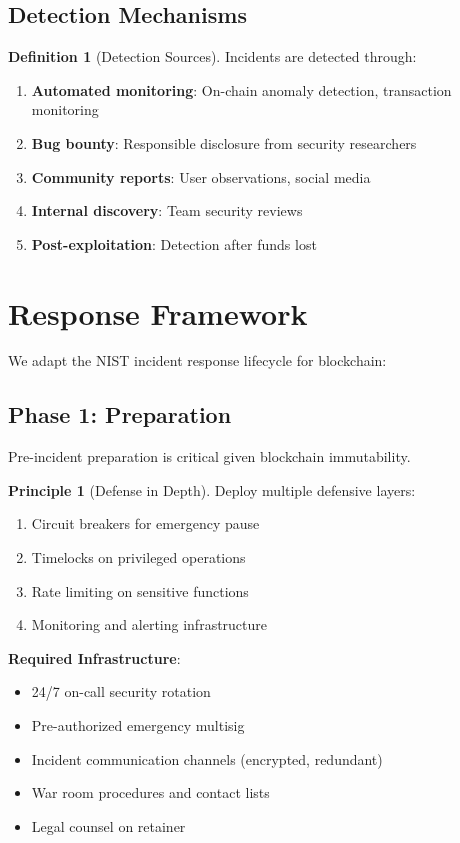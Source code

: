 \documentclass[11pt,a4paper]{article}
\theoremstyle{definition}
\newtheorem{definition}{Definition}
\newtheorem{principle}{Principle}
\begin{document}
\subsection{Detection Mechanisms}

\begin{definition}[Detection Sources]
Incidents are detected through:
\begin{enumerate}
    \item \textbf{Automated monitoring}: On-chain anomaly detection, transaction monitoring
    \item \textbf{Bug bounty}: Responsible disclosure from security researchers
    \item \textbf{Community reports}: User observations, social media
    \item \textbf{Internal discovery}: Team security reviews
    \item \textbf{Post-exploitation}: Detection after funds lost
\end{enumerate}
\end{definition}

\section{Response Framework}

We adapt the NIST incident response lifecycle for blockchain:

\subsection{Phase 1: Preparation}

Pre-incident preparation is critical given blockchain immutability.

\begin{principle}[Defense in Depth]
Deploy multiple defensive layers:
\begin{enumerate}
    \item Circuit breakers for emergency pause
    \item Timelocks on privileged operations
    \item Rate limiting on sensitive functions
    \item Monitoring and alerting infrastructure
\end{enumerate}
\end{principle}

\textbf{Required Infrastructure}:
\begin{itemize}
    \item 24/7 on-call security rotation
    \item Pre-authorized emergency multisig
    \item Incident communication channels (encrypted, redundant)
    \item War room procedures and contact lists
    \item Legal counsel on retainer
\end{itemize}
\end{document}

